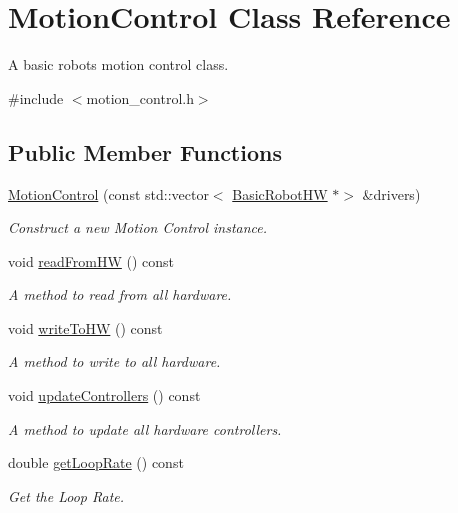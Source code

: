 \hypertarget{classMotionControl}{}\section{Motion\+Control Class Reference}
\label{classMotionControl}


A basic robot\textquotesingle{}s motion control class.  




{\ttfamily \#include $<$motion\+\_\+control.\+h$>$}

\subsection*{Public Member Functions}
\begin{DoxyCompactItemize}
\item 
\hyperlink{classMotionControl_ae59561bd3b5a703377c3d905d6bcf0ac}{Motion\+Control} (const std\+::vector$<$ \hyperlink{classBasicRobotHW}{Basic\+Robot\+HW} $\ast$$>$ \&drivers)
\begin{DoxyCompactList}\small\item\em Construct a new Motion Control instance. \end{DoxyCompactList}\item 
\mbox{\label{classMotionControl_af26ee6948d7b657d6cc9480f773e8958}} 
void \hyperlink{classMotionControl_af26ee6948d7b657d6cc9480f773e8958}{read\+From\+HW} () const
\begin{DoxyCompactList}\small\item\em A method to read from all hardware. \end{DoxyCompactList}\item 
\mbox{\label{classMotionControl_a2bddd1520df90b5f3cba6baa88256817}} 
void \hyperlink{classMotionControl_a2bddd1520df90b5f3cba6baa88256817}{write\+To\+HW} () const
\begin{DoxyCompactList}\small\item\em A method to write to all hardware. \end{DoxyCompactList}\item 
\mbox{\label{classMotionControl_a64d6dfbced6ac7e8bed6147d9b7c84d5}} 
void \hyperlink{classMotionControl_a64d6dfbced6ac7e8bed6147d9b7c84d5}{update\+Controllers} () const
\begin{DoxyCompactList}\small\item\em A method to update all hardware controllers. \end{DoxyCompactList}\item 
double \hyperlink{classMotionControl_aa54a9d8ce253dce201af950a2d7c12b5}{get\+Loop\+Rate} () const
\begin{DoxyCompactList}\small\item\em Get the Loop Rate. \end{DoxyCompactList}\end{DoxyCompactItemize}


